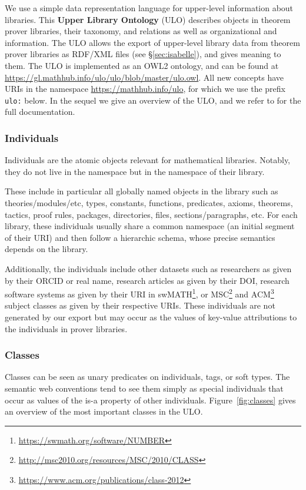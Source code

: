 We use a simple data representation language for upper-level information about libraries. This \textbf{Upper Library Ontology} (ULO) describes objects in theorem prover libraries, their taxonomy, and relations as well as organizational and information.
The ULO allows the export of upper-level library data from theorem prover libraries as RDF/XML files (see \S\ref{sec:isabelle}), and gives meaning to them. 
The ULO is implemented as an OWL2 ontology, and can be found at \url{https://gl.mathhub.info/ulo/ulo/blob/master/ulo.owl}.
All new concepts have URIs in the namespace \url{https://mathhub.info/ulo}, for which we use the prefix \lstinline|ulo:| below.
In the sequel we give an overview of the ULO, and we refer to \cite{ULODoc:on} for the full documentation.

\subsubsection{Individuals}

Individuals are the atomic objects relevant for mathematical libraries.
Notably, they do not live in the {\ns} namespace but in the namespace of their library.

These include in particular all globally named objects in the library such as theories/modules/etc, types, constants, functions, predicates, axioms, theorems, tactics, proof rules, packages, directories, files, sections/paragraphs, etc.
For each library, these individuals usually share a common namespace (an initial segment of their URI) and then follow a hierarchic schema, whose precise semantics depends on the library.

Additionally, the individuals include other datasets such as
researchers as given by their ORCID or real name, 
research articles as given by their DOI,
research software systems as given by their URI in swMATH\footnote{\url{https://swmath.org/software/NUMBER}}, 
or MSC\footnote{\url{http://msc2010.org/resources/MSC/2010/CLASS}} and ACM\footnote{\url{https://www.acm.org/publications/class-2012}} subject classes as given by their respective URIs.
These individuals are not generated by our export but may occur as the values of key-value attributions to the individuals in prover libraries.

\subsubsection{Classes}

Classes can be seen as unary predicates on individuals, tags, or soft types.
The semantic web conventions tend to see them simply as special individuals that occur as values of the is-a property of other individuals.
Figure~\ref{fig:classes} gives an overview of the most important classes in the ULO.

